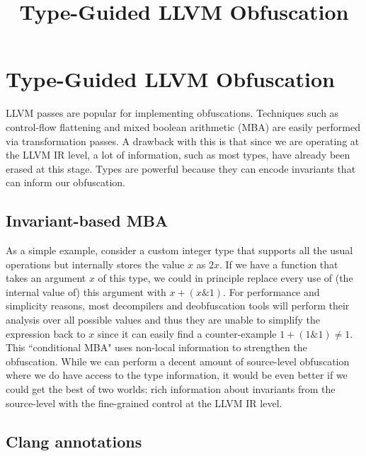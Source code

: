 \documentclass[twocolumn]{article}
\begin{document}
\title{Type-Guided LLVM Obfuscation}
\date{}

\section*{Type-Guided LLVM Obfuscation}
\vspace*{-0.5\baselineskip}

LLVM passes are popular for implementing obfuscations. Techniques such as control-flow flattening and mixed boolean arithmetic (MBA) are easily performed via transformation passes. A drawback with this is that since we are operating at the LLVM IR level, a lot of information, such as most  types, have already been erased at this stage. Types are powerful because they can encode invariants that can inform our obfuscation.

\vspace*{-0.5\baselineskip}
\subsection*{Invariant-based MBA}

As a simple example, consider a custom integer type that supports all the usual operations but internally stores the value $x$ as $2x$. If we have a function that takes an argument $x$ of this type, we could in principle replace every use of (the internal value of) this argument with $x + (x \& 1)$. For performance and simplicity reasons, most decompilers and deobfuscation tools will perform their analysis over all possible values and thus they are unable to simplify the expression back to $x$ since it can easily find a counter-example $1 + (1 \& 1) \neq 1$. This ``conditional MBA" uses non-local information to strengthen the obfuscation. While we can perform a decent amount of source-level obfuscation where we do have access to the type information, it would be even better if we could get the best of two worlds: rich information about invariants from the source-level with the fine-grained control at the LLVM IR level.

\vspace*{-0.5\baselineskip}
\subsection*{Clang annotations}
\end{document}
